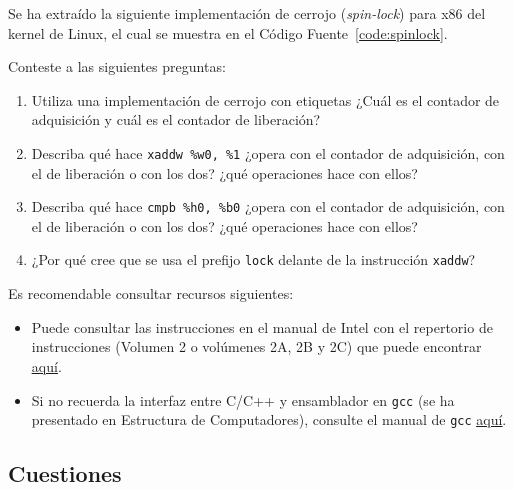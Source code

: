 \begin{ejercicio}
    Se ha extraído la siguiente implementación de cerrojo (\textit{spin-lock}) para x86 del kernel de Linux, el cual se muestra
    en el Código Fuente~\ref{code:spinlock}.
    

    Conteste a las siguientes preguntas:
    \begin{enumerate}
        \item Utiliza una implementación de cerrojo con etiquetas ¿Cuál es el contador de adquisición y cuál es el
        contador de liberación?
        \item Describa qué hace \verb|xaddw %w0, %1| ¿opera con el contador de adquisición, con el de liberación o con
        los dos? ¿qué operaciones hace con ellos?
        \item Describa qué hace \verb|cmpb %h0, %b0| ¿opera con el contador de adquisición, con el de liberación o con
        los dos? ¿qué operaciones hace con ellos?
        \item ¿Por qué cree que se usa el prefijo \verb|lock| delante de la instrucción \verb|xaddw|? 
    \end{enumerate}

    \begin{observacion} Es recomendable consultar recursos siguientes:
        \begin{itemize}
            \item Puede consultar las instrucciones en el manual de Intel con el repertorio de instrucciones
            (Volumen 2 o volúmenes 2A, 2B y 2C) que puede encontrar \href{http://www.intel.com/content/www/us/en/processors/architectures-software-developer-manuals.html}{\color{blue}\ul{aquí}}.
            \item Si no recuerda la interfaz entre C/C++ y ensamblador en \verb|gcc| (se ha presentado en Estructura de
            Computadores), consulte el manual de \verb|gcc| \href{http://gcc.gnu.org/onlinedocs/gcc-4.6.2/gcc/ExtendedAsm.html#Extended-Asm}{\color{blue}\ul{aquí}}.
        \end{itemize}
    \end{observacion}
\end{ejercicio}


\subsection{Cuestiones}

